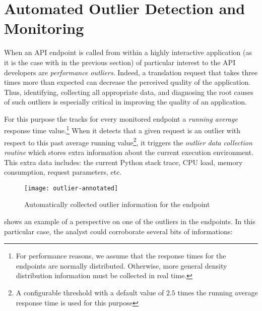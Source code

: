 
  \section{Automated Outlier Detection and Monitoring}
  \label{sec:outliers}
  
  When an API endpoint is called from within a highly interactive application 
    (as it is the case with \epTranslationsColor in the previous section) 
  of particular interest to the API developers are {\em performance outliers}.   
  Indeed, a translation request that takes three times more than expected can   decrease the perceived quality of the application. 
  Thus, identifying, collecting all appropriate data, and diagnosing the root   causes of such outliers is especially critical in improving the quality of an application. 
    
  For this purpose the \tool tracks for every monitored endpoint a {\em running average} response time value.\footnote{
    For performance reasons, we assume that the response times for the endpoints are normally distributed. 
    Otherwise, more general density distribution information must be collected in real time.}
  When it detects that a given request is an outlier with respect to this past average running value\footnote{A configurable threshold with a default value of $2.5$ times the running average response time is used for this purpose}, it triggers the {\em outlier data collection routine} which stores extra information about the current execution environment. This extra data includes: the current Python stack trace, CPU load, memory consumption, request parameters, etc. 

  \begin{figure}[h!]
    \centering
    \texttt{[image: outlier-annotated]}
    \caption{Automatically collected outlier information for the \epTranslationsColor endpoint}
    \label{fig:stack}
  \end{figure}
  
 shows an example of a   perspective on one of the outliers in the \epTranslationsColor endpoints. In this particular case, the analyst could corroborate several bits of informations: 

